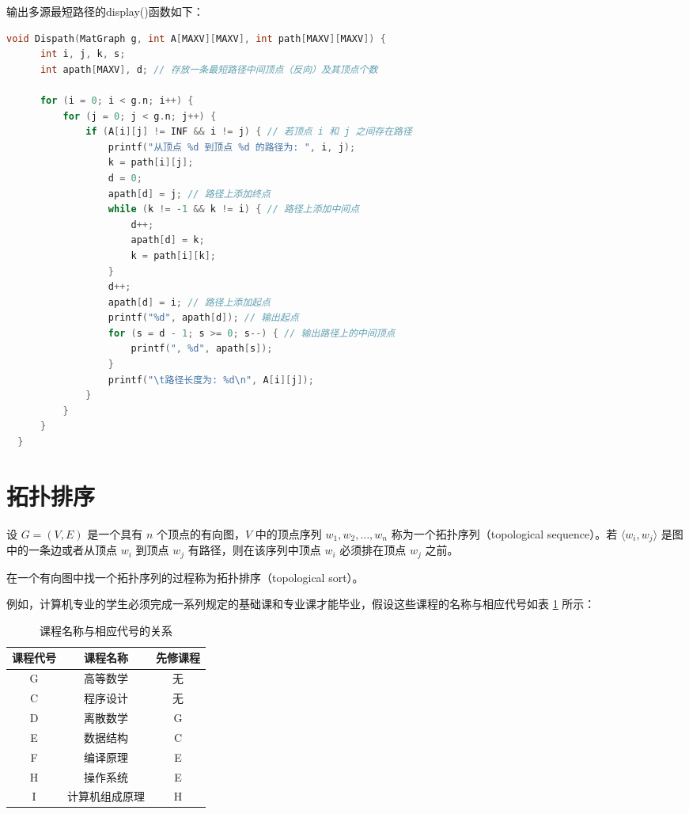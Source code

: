 \documentclass[lang=cn,newtx,10pt,scheme=chinese]{elegantbook}
\begin{document}
输出多源最短路径的display()函数如下：

\begin{lstlisting}[language=C, caption={输出最短路径的 Dispath 函数}]
  void Dispath(MatGraph g, int A[MAXV][MAXV], int path[MAXV][MAXV]) {
      int i, j, k, s;
      int apath[MAXV], d; // 存放一条最短路径中间顶点（反向）及其顶点个数
  
      for (i = 0; i < g.n; i++) {
          for (j = 0; j < g.n; j++) {
              if (A[i][j] != INF && i != j) { // 若顶点 i 和 j 之间存在路径
                  printf("从顶点 %d 到顶点 %d 的路径为: ", i, j);
                  k = path[i][j];
                  d = 0;
                  apath[d] = j; // 路径上添加终点
                  while (k != -1 && k != i) { // 路径上添加中间点
                      d++;
                      apath[d] = k;
                      k = path[i][k];
                  }
                  d++;
                  apath[d] = i; // 路径上添加起点
                  printf("%d", apath[d]); // 输出起点
                  for (s = d - 1; s >= 0; s--) { // 输出路径上的中间顶点
                      printf(", %d", apath[s]);
                  }
                  printf("\t路径长度为: %d\n", A[i][j]);
              }
          }
      }
  }
  \end{lstlisting}

\section{拓扑排序}

设 $G = (V, E)$ 是一个具有 $n$ 个顶点的有向图，$V$ 中的顶点序列 $w_1, w_2, \dots, w_n$ 称为一个拓扑序列（topological sequence）。若 $\langle w_i, w_j \rangle$ 是图中的一条边或者从顶点 $w_i$ 到顶点 $w_j$ 有路径，则在该序列中顶点 $w_i$ 必须排在顶点 $w_j$ 之前。

在一个有向图中找一个拓扑序列的过程称为拓扑排序（topological sort）。

例如，计算机专业的学生必须完成一系列规定的基础课和专业课才能毕业，假设这些课程的名称与相应代号如表 \ref{tab:course} 所示：

\begin{table}[h!]
  \centering
  \caption{课程名称与相应代号的关系}
  \label{tab:course}
  \begin{tabular}{|c|c|c|}
    \hline
    课程代号 & 课程名称 & 先修课程 \\ \hline
    G & 高等数学 & 无 \\ \hline
    C & 程序设计 & 无 \\ \hline
    D & 离散数学 & G \\ \hline
    E & 数据结构 & C \\ \hline
    F & 编译原理 & E \\ \hline
    H & 操作系统 & E \\ \hline
    I & 计算机组成原理 & H \\ \hline
  \end{tabular}
\end{table}
\end{document}
